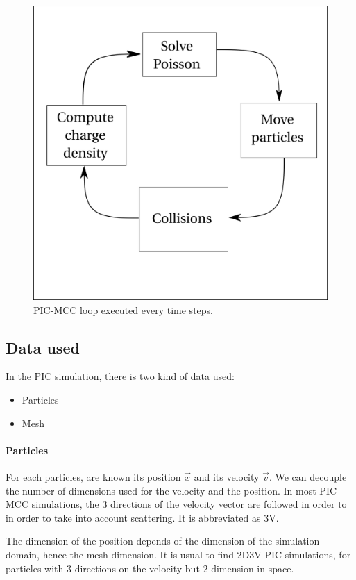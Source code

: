 \begin{figure}[hbtp]
  \centering
  \includegraphics{picloop.png}
  \caption{\ac{PIC}-\ac{MCC} loop executed every time steps.}
  \label{fig-picloop}
\end{figure}

\subsection{Data used}
In the \ac{PIC} simulation, there is two kind of data used:
\begin{itemize}
  \item Particles
  \item Mesh
\end{itemize}

\paragraph{Particles}
For each particles, are known its position $\vec{x}$ and its velocity $\vec{v}$.
We can decouple the number of dimensions used for the velocity and the position.
In most \ac{PIC}-\ac{MCC} simulations, the 3 directions of the velocity vector are followed in order to in order to take into account scattering.
It is abbreviated as \acs{3V}.

The dimension of the position depends of the dimension of the simulation domain, hence the mesh dimension.
It is usual to find \acs{2D}\ac{3V} \ac{PIC} simulations, for particles with 3 directions on the velocity but 2 dimension in space.


